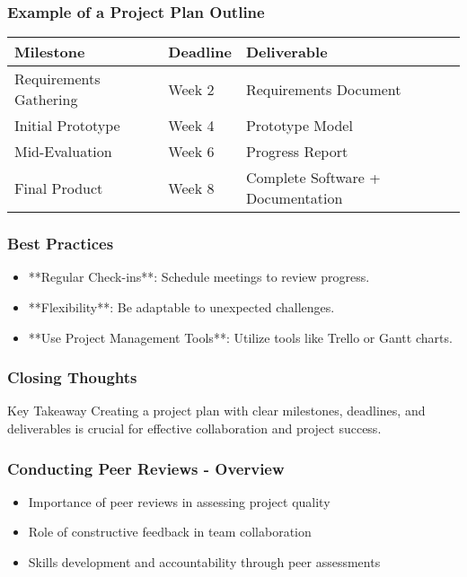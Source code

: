 \documentclass[aspectratio=169]{beamer}
\begin{document}
\begin{frame}[fragile]
    \frametitle{Example of a Project Plan Outline}
    \begin{table}[ht]
        \centering
        \begin{tabular}{|l|l|l|}
            \hline
            \textbf{Milestone} & \textbf{Deadline} & \textbf{Deliverable} \\ \hline
            Requirements Gathering & Week 2 & Requirements Document \\ \hline
            Initial Prototype & Week 4 & Prototype Model \\ \hline
            Mid-Evaluation & Week 6 & Progress Report \\ \hline
            Final Product & Week 8 & Complete Software + Documentation \\ \hline
        \end{tabular}
    \end{table}
\end{frame}

\begin{frame}[fragile]
    \frametitle{Best Practices}
    \begin{itemize}
        \item **Regular Check-ins**: Schedule meetings to review progress.
        \item **Flexibility**: Be adaptable to unexpected challenges.
        \item **Use Project Management Tools**: Utilize tools like Trello or Gantt charts.
    \end{itemize}
\end{frame}

\begin{frame}[fragile]
    \frametitle{Closing Thoughts}
    \begin{block}{Key Takeaway}
        Creating a project plan with clear milestones, deadlines, and deliverables 
        is crucial for effective collaboration and project success. 
    \end{block}
\end{frame}

\begin{frame}[fragile]
    \frametitle{Conducting Peer Reviews - Overview}
    \begin{itemize}
        \item Importance of peer reviews in assessing project quality
        \item Role of constructive feedback in team collaboration
        \item Skills development and accountability through peer assessments
    \end{itemize}
\end{frame}
\end{document}
